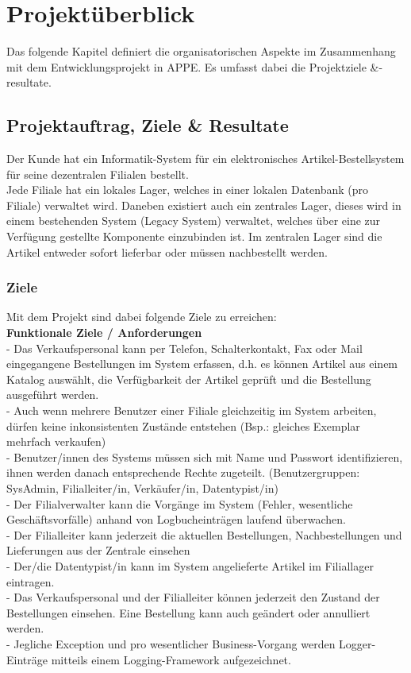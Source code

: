 \documentclass[a4paper, 10pt, fleqn]{article}
\begin{document}
%

\tableofcontents
\clearpage
\section{Projektüberblick}
Das folgende Kapitel definiert die organisatorischen Aspekte im Zusammenhang mit dem Entwicklungsprojekt in APPE. Es umfasst dabei die Projektziele \&-resultate.
\subsection{Projektauftrag, Ziele \& Resultate}
Der Kunde hat ein Informatik-System für ein elektronisches Artikel-Bestellsystem für seine dezentralen Filialen bestellt.\\
Jede Filiale hat ein lokales Lager, welches in einer lokalen Datenbank (pro Filiale) verwaltet wird. Daneben existiert auch ein zentrales Lager, dieses wird in einem bestehenden System (Legacy System) verwaltet, welches über eine zur Verfügung gestellte Komponente einzubinden ist. Im zentralen Lager sind die Artikel entweder sofort lieferbar oder müssen nachbestellt werden.
\subsubsection{Ziele}
Mit dem Projekt sind dabei folgende Ziele zu erreichen:\\
\textbf{Funktionale Ziele / Anforderungen}\\
- Das Verkaufspersonal kann per Telefon, Schalterkontakt, Fax oder Mail eingegangene Bestellungen im System erfassen, d.h. es können Artikel aus einem Katalog auswählt, die Verfügbarkeit der Artikel geprüft und die Bestellung ausgeführt werden.\\
- Auch wenn mehrere Benutzer einer Filiale gleichzeitig im System arbeiten, dürfen keine inkonsistenten Zustände entstehen (Bsp.: gleiches Exemplar mehrfach verkaufen)\\
- Benutzer/innen des Systems müssen sich mit Name und Passwort identifizieren, ihnen werden danach entsprechende Rechte zugeteilt. (Benutzergruppen: SysAdmin, Filialleiter/in, Verkäufer/in, Datentypist/in)\\
- Der Filialverwalter kann die Vorgänge im System (Fehler, wesentliche Geschäftsvorfälle) anhand von Logbucheinträgen laufend überwachen.\\
- Der Filialleiter kann jederzeit die aktuellen Bestellungen, Nachbestellungen und Lieferungen aus der Zentrale einsehen\\
- Der/die Datentypist/in kann im System angelieferte Artikel im Filiallager eintragen.\\
- Das Verkaufspersonal und der Filialleiter können jederzeit den Zustand der Bestellungen einsehen. Eine Bestellung kann auch geändert oder annulliert werden.\\
- Jegliche Exception und pro wesentlicher Business-Vorgang werden Logger-Einträge mitteils einem Logging-Framework aufgezeichnet.\\
\end{document}
